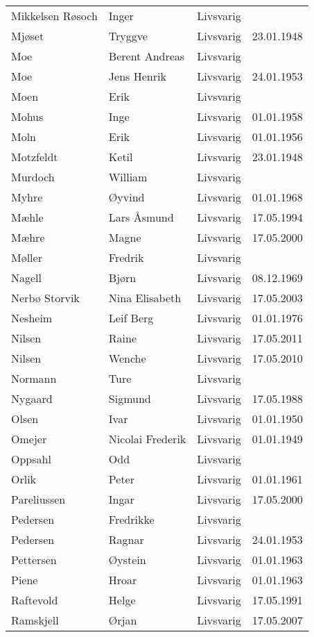 \begin{longtable}{llll}
Mikkelsen Røsoch	&	Inger	&	Livsvarig 	&		\\
Mjøset	&	Tryggve	&	Livsvarig 	&	23.01.1948	\\
Moe	&	Berent Andreas	&	Livsvarig 	&		\\
Moe	&	Jens Henrik	&	Livsvarig 	&	24.01.1953	\\
Moen	&	Erik	&	Livsvarig 	&		\\
Mohus	&	Inge	&	Livsvarig 	&	01.01.1958	\\
Moln	&	Erik	&	Livsvarig 	&	01.01.1956	\\
Motzfeldt	&	Ketil	&	Livsvarig 	&	23.01.1948	\\
Murdoch	&	William	&	Livsvarig 	&		\\
Myhre	&	Øyvind	&	Livsvarig 	&	01.01.1968	\\
Mæhle	&	Lars Åsmund	&	Livsvarig 	&	17.05.1994	\\
Mæhre	&	Magne	&	Livsvarig	&	17.05.2000	\\
Møller	&	Fredrik	&	Livsvarig 	&		\\
Nagell	&	Bjørn	&	Livsvarig 	&	08.12.1969	\\
Nerbø Storvik 	&	Nina Elisabeth	&	Livsvarig	&	17.05.2003	\\
Nesheim	&	Leif Berg	&	Livsvarig 	&	01.01.1976	\\
Nilsen	&	Raine	&	Livsvarig	&	17.05.2011	\\
Nilsen	&	Wenche	&	Livsvarig	&	17.05.2010	\\
Normann	&	Ture	&	Livsvarig 	&		\\
Nygaard	&	Sigmund	&	Livsvarig 	&	17.05.1988	\\
Olsen	&	Ivar	&	Livsvarig 	&	01.01.1950	\\
Omejer	&	Nicolai Frederik	&	Livsvarig 	&	01.01.1949	\\
Oppsahl	&	Odd	&	Livsvarig 	&		\\
Orlik	&	Peter	&	Livsvarig 	&	01.01.1961	\\
Pareliussen	&	Ingar	&	Livsvarig	&	17.05.2000	\\
Pedersen	&	Fredrikke	&	Livsvarig 	&		\\
Pedersen	&	Ragnar	&	Livsvarig 	&	24.01.1953	\\
Pettersen	&	Øystein	&	Livsvarig 	&	01.01.1963	\\
Piene	&	Hroar	&	Livsvarig 	&	01.01.1963	\\
Raftevold	&	Helge	&	Livsvarig 	&	17.05.1991	\\
Ramskjell	&	Ørjan	&	Livsvarig	&	17.05.2007	\\

\end{longtable}
